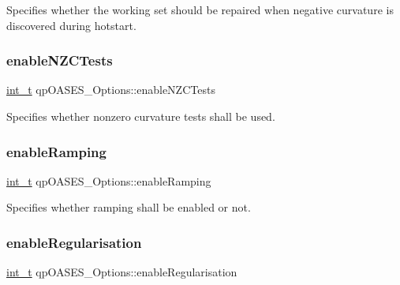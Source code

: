 Specifies whether the working set should be repaired when negative curvature is discovered during hotstart. \mbox{\label{structqp_o_a_s_e_s___options_a03ac2d546d482acd3c7b75d234efe10a}} 
\subsubsection{\texorpdfstring{enable\+N\+Z\+C\+Tests}{enableNZCTests}}
{\footnotesize\ttfamily \hyperlink{_types_8hpp_ab6fd6105e64ed14a0c9281326f05e623}{int\+\_\+t} qp\+O\+A\+S\+E\+S\+\_\+\+Options\+::enable\+N\+Z\+C\+Tests}

Specifies whether nonzero curvature tests shall be used. \mbox{\label{structqp_o_a_s_e_s___options_a6a24b728aac71b065738858d90340c79}} 
\subsubsection{\texorpdfstring{enable\+Ramping}{enableRamping}}
{\footnotesize\ttfamily \hyperlink{_types_8hpp_ab6fd6105e64ed14a0c9281326f05e623}{int\+\_\+t} qp\+O\+A\+S\+E\+S\+\_\+\+Options\+::enable\+Ramping}

Specifies whether ramping shall be enabled or not. \mbox{\label{structqp_o_a_s_e_s___options_a2097669172e86625febce9309c2ca9ab}} 
\subsubsection{\texorpdfstring{enable\+Regularisation}{enableRegularisation}}
{\footnotesize\ttfamily \hyperlink{_types_8hpp_ab6fd6105e64ed14a0c9281326f05e623}{int\+\_\+t} qp\+O\+A\+S\+E\+S\+\_\+\+Options\+::enable\+Regularisation}

